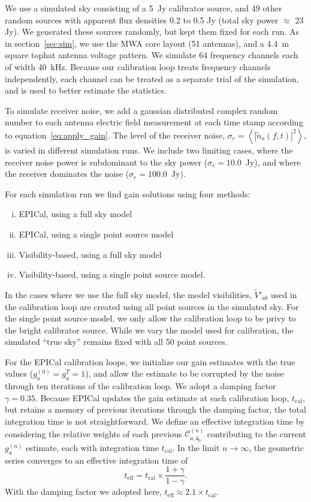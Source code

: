 \documentclass[a4paper,fleqn,usenatbib]{mnras}
\newcommand{\spix}{\ensuremath{\hat{\mathbf{s}}_{0}}}
\newcommand{\Cna}[1][n]{\ensuremath{\mathcal{C}^{(#1)}_{a,\spix}}}
\newcommand{\V}{\ensuremath{\widetilde{V}}}
\newcommand{\damp}{\ensuremath{\gamma}}
\newcommand{\tcal}{\ensuremath{t_{\mathrm{cal}}}}
\newcommand{\teff}{\ensuremath{t_{\mathrm{eff}}}}
\begin{document}
We use a simulated sky consisting of a 5~Jy calibrator source, and 49 other random sources 
with apparent flux densities 0.2 to 0.5 Jy (total sky power $\approx$ 23 Jy). We generated 
these sources randomly, but kept them fixed for each run. As in section~\ref{sec:sim}, we use 
the MWA core layout (51 antennas), and a 4.4~m square tophat antenna voltage pattern. We 
simulate 64 frequency channels each of width 40~kHz. Because our calibration loop treats 
frequency channels independently, each channel can be treated as a separate trial of the 
simulation, and is used to better estimate the statistics.

To simulate receiver noise, we add a gaussian distributed complex random number to each 
antenna electric field measurement at each time stamp according to 
equation~\ref{eq:apply_gain}. The level of the receiver noise, $\sigma_r = \left<\left|
\widetilde{n}_a(f,t)\right|^2\right>$, is varied in different simulation runs. We include two limiting 
cases, where the receiver noise power is subdominant to the sky power ($\sigma_r = 
10.0$~Jy), and where the receiver dominates the noise ($\sigma_r=100.0$~Jy).

For each simulation run we find gain solutions using four methods:
\begin{enumerate}[i.]
\item EPICal, using a full sky model
\item EPICal, using a single point source model
\item Visibility-based, using a full sky model
\item Visibility-based, using a single point source model.
\end{enumerate}
In the cases where we use the full sky model, the model visibilities, $\V'_{ab}$ used in the 
calibration loop are created using all point sources in the simulated sky. For the single point 
source model, we only allow the calibration loop to be privy to the bright calibrator source. 
While we vary the model used for calibration, the simulated ``true sky'' remains fixed with all 50 
point sources.

For the EPICal calibration loops, we initialize our gain estimates with the true values 
(${g^{(0)}_a=g^T_a=1}$), and allow the estimate to be corrupted by the noise through ten 
iterations of the calibration loop. We adopt a damping factor $\damp=0.35$. Because EPICal 
updates the gain estimate at each calibration loop, \tcal, but retains a memory of previous 
iterations through the damping factor, the total integration time is not straightforward. We define 
an effective integration time by considering the relative weights of each previous $\Cna$ 
contributing to the current $g^{(n)}_a$ estimate, each with integration time \tcal. In the limit $n
\rightarrow \infty$, the geometric series converges to an effective integration time of
\begin{equation}
\teff = \tcal \times \frac{1+\damp}{1-\damp}.
\end{equation}
With the damping factor we adopted here, $\teff \approx 2.1 \times \tcal$. 
\end{document}
